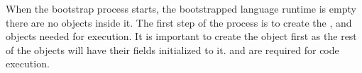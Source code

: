 When the bootstrap process starts, the bootstrapped language runtime is empty \ie there are no objects inside it. 
The first step of the process is to create the ,  and  objects needed for execution. It is important to create the  object first as the rest of the objects will have their fields initialized to it.  and  are required for code execution.
%






